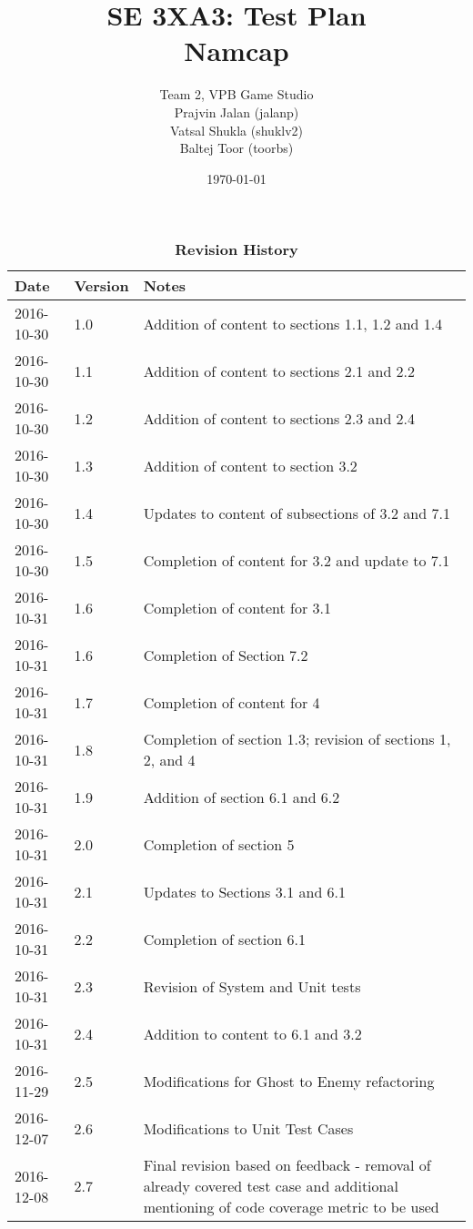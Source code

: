 \documentclass[12pt, titlepage]{article}
\title{SE 3XA3: Test Plan\\Namcap}
\author{Team 2, VPB Game Studio
		\\ Prajvin Jalan (jalanp)
		\\ Vatsal Shukla (shuklv2)
		\\ Baltej Toor (toorbs)
}
\date{\today}
\begin{document}
\maketitle

\tableofcontents
\listoftables
\listoffigures

\begin{table}
\caption{\bf Revision History}
\begin{tabularx}{\textwidth}{p{3cm}p{2cm}X}
\toprule {\bf Date} & {\bf Version} & {\bf Notes}\\
\midrule
2016-10-30 & 1.0 & Addition of content to sections 1.1, 1.2 and 1.4\\
2016-10-30 & 1.1 & Addition of content to sections 2.1 and 2.2\\
2016-10-30 & 1.2 & Addition of content to sections 2.3 and 2.4\\
2016-10-30 & 1.3 & Addition of content to section 3.2\\
2016-10-30 & 1.4 & Updates to content of subsections of 3.2 and 7.1\\
2016-10-30 & 1.5 & Completion of content for 3.2 and update to 7.1\\
2016-10-31 & 1.6 & Completion of content for 3.1\\
2016-10-31 & 1.6 & Completion of Section 7.2\\
2016-10-31 & 1.7 & Completion of content for 4\\
2016-10-31 & 1.8 & Completion of section 1.3; revision of sections 1, 2, and 4\\
2016-10-31 & 1.9 & Addition of section 6.1 and 6.2\\
2016-10-31 & 2.0 & Completion of section 5\\
2016-10-31 & 2.1 & Updates to Sections 3.1 and 6.1\\
2016-10-31 & 2.2 & Completion of section 6.1\\
2016-10-31 & 2.3 & Revision of System and Unit tests\\
2016-10-31 & 2.4 & Addition to content to 6.1 and 3.2\\
2016-11-29 & 2.5 & Modifications for Ghost to Enemy refactoring\\
2016-12-07 & 2.6 & Modifications to Unit Test Cases\\
2016-12-08 & 2.7 & Final revision based on feedback - removal of already covered test case and additional mentioning of code coverage metric to be used\\
\bottomrule
\end{tabularx}
\end{table}
\end{document}
